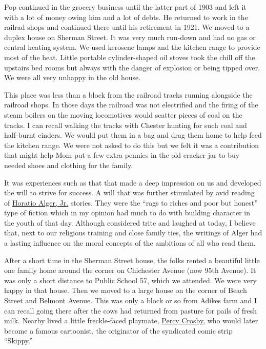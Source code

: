 \documentclass[12pt]{book}              %
\begin{document}
Pop continued in the grocery business until the latter part of 1903 and left it with a lot of money owing him and a lot of debts. He returned to work in the railrad shops and continued there until his retirement in 1921. We moved to a duplex house on Sherman Street. It was very much run-down and had no gas or central heating system. We used kerosene lamps and the kitchen range to provide most of the heat. Little portable cylinder-shaped oil stoves took the chill off the upstairs bed rooms but always with the danger of explosion or being tipped over. We were all very unhappy in the old house.

This place was less than a block from the railroad tracks running alongside the railroad shops. In those days the railroad was not electrified and the firing of the steam boilers on the moving locomotives would scatter pieces of coal on the tracks. I can recall walking the tracks with Chester hunting for such coal and half-burnt cinders. We would put them in a bag and drag them home to help feed the kitchen range. We were not asked to do this but we felt it was a contribution that might help Mom put a few extra pennies in the old cracker jar to buy needed shoes and clothing for the family. 

It was experiences such as that that made a deep impression on us and developed the will to strive for success. A will that was further stimulated by avid reading of \href{http://en.wikipedia.org/wiki/Horatio_Alger,_Jr.}{Horatio Alger, Jr.} stories. They were the ``rags to riches and poor but honest'' type of fiction which in my opinion had much to do with building character in the youth of that day. Although considered trite and laughed at today, I believe that, next to our religious training and close family ties, the writings of Alger had a lasting influence on the moral concepts of the ambitions of all who read them.

After a short time in the Sherman Street house, the folks rented a beautiful little one family home around the corner on Chichester Avenue (now 95th Avenue).  It was only a short distance to Public School 57, which we attended. We were very happy in that house. Then we moved to a large house on the corner of Beach Street and Belmont Avenue. This was only a block or so from Adikes farm and I can recall going there after the cows had returned from pasture for pails of fresh milk. Nearby lived a little freckle-faced playmate, \href{http://en.wikipedia.org/wiki/Percy_Crosby}{Percy Crosby}, who would later become a famous cartoonist, the originator of the syndicated comic strip ``Skippy.'' 
\end{document}
